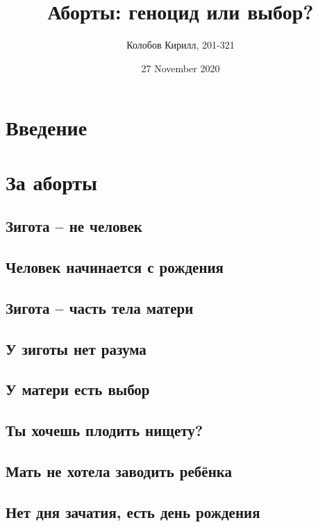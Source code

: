 \documentclass[a4paper,12pt]{report}
\author{Колобов Кирилл, 201-321}
\date{27 November 2020}
\title{Аборты: геноцид или выбор?}
\begin{document}
\maketitle

\tableofcontents

\chapter{Введение}

\chapter{За аборты}
\section{Зигота -- не человек}
\section{Человек начинается с рождения}
\section{Зигота -- часть тела матери}
\section{У зиготы нет разума}
\section{У матери есть выбор}
\section{Ты хочешь плодить нищету?}
\section{Мать не хотела заводить ребёнка}
\section{Нет дня зачатия, есть день рождения}
\section{}
\section{}
\section{}
\end{document}
